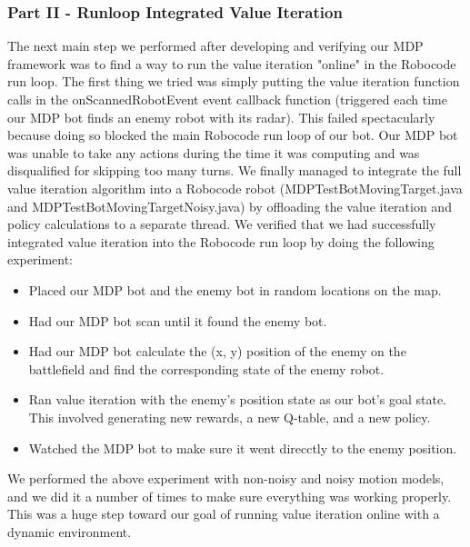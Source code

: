 \documentclass{aiaa-tc}%
\begin{document}
\subsubsection{Part II - Runloop Integrated Value Iteration}
The next main step we performed after developing and verifying our MDP framework was to find a way to run the value iteration "online" in the Robocode run loop. The first thing we tried was simply putting the value iteration function calls in the onScannedRobotEvent event callback function (triggered each time our MDP bot finds an enemy robot with its radar). This failed spectacularly because doing so blocked the main Robocode run loop of our bot. Our MDP bot was unable to take any actions during the time it was computing and was disqualified for skipping too many turns. We finally managed to integrate the full value iteration algorithm into a Robocode robot (MDPTestBotMovingTarget.java and MDPTestBotMovingTargetNoisy.java) by offloading the value iteration and policy calculations to a separate thread. We verified that we had successfully integrated value iteration into the Robocode run loop by doing the following experiment:
\begin{itemize}
\item Placed our MDP bot and the enemy bot in random locations on the map.
\item Had our MDP bot scan until it found the enemy bot.
\item Had our MDP bot calculate the (x, y) position of the enemy on the battlefield and find the corresponding state of the enemy robot.
\item Ran value iteration with the enemy's position state as our bot's goal state. This involved generating new rewards, a new Q-table, and a new policy.
\item Watched the MDP bot to make sure it went direcctly to the enemy position.
\end{itemize}
We performed the above experiment with non-noisy and noisy motion models, and we did it a number of times to make sure everything was working properly. This was a huge step toward our goal of running value iteration online with a dynamic environment.
\end{document}
